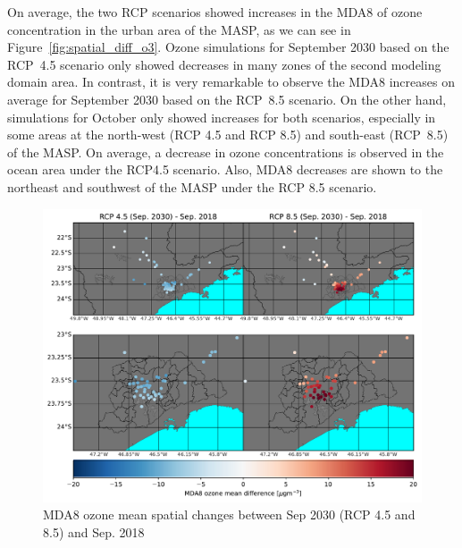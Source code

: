 On average, the two RCP scenarios showed increases in the MDA8 of ozone concentration in the urban area of the MASP, as we can see in Figure~\ref{fig:spatial_diff_o3}. Ozone simulations for September 2030 based on the RCP~4.5 scenario only showed decreases in many zones of the second modeling domain area. In contrast, it is very remarkable to observe the MDA8 increases on average for September 2030 based on the RCP~8.5 scenario. On the other hand, simulations for October only showed increases for both scenarios, especially in some areas at the north-west (RCP 4.5 and RCP 8.5) and south-east (RCP~8.5) of the MASP. On average, a decrease in ozone concentrations is observed in the ocean area under the RCP4.5 scenario. Also, MDA8 decreases are shown to the northeast and southwest of the MASP under the RCP 8.5 scenario.


\begin{figure}[hbt]
\begin{center}
	\includegraphics[width=1\textwidth]{fig/mda8_spatial_station_sep}
\end{center}
  \caption{MDA8 ozone mean spatial changes between Sep 2030 (RCP 4.5 and 8.5) and Sep. 2018}
  \label{fig:spatial_o3_sep}
\end{figure}

